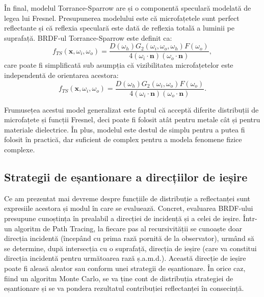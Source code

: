 \documentclass[12pt,a4paper]{report}
\numberwithin{equation}{section} %
\begin{document}
În final, modelul Torrance-Sparrow are și o componentă speculară modelată de legea
lui Fresnel. Presupunerea modelului este că microfațetele sunt perfect reflectante
și că reflexia speculară este dată de reflexia totală a luminii pe suprafață.
BRDF-ul Torrance-Sparrow este definit ca:
\begin{equation}
	f_{TS}(\mathbf{x}, \omega_i, \omega_o) = \frac{D(\omega_h)G_2(\omega_i, \omega_o, \omega_h)F(\omega_o)}{4(\omega_i \cdot \mathbf{n})(\omega_o \cdot \mathbf{n})},
\end{equation}
care poate fi simplificată sub asumpția că vizibilitatea microfațetelor este independentă
de orientarea acestora:
\begin{equation}\label{eq:ts}
	f_{TS}(\mathbf{x}, \omega_i, \omega_o) = \frac{D(\omega_h)G_2(\omega_i, \omega_o)F(\omega_o)}{4(\omega_i \cdot \mathbf{n})(\omega_o \cdot \mathbf{n})}.
\end{equation}

Frumusețea acestui model generalizat este faptul că acceptă diferite distribuții
de microfațete și funcții Fresnel, deci poate fi folosit atât pentru metale cât
și pentru materiale dielectrice. În plus, modelul este destul de simplu pentru a
putea fi folosit în practică, dar suficient de complex pentru a modela fenomene
fizice complexe.

\subsection{Strategii de eșantionare a direcțiilor de ieșire}

Ce am prezentat mai devreme despre funcțiile de distribuție a reflectanței
sunt expresiile acestora și modul în care se evaluează. Concret, evaluarea
BRDF-ului presupune cunoștința în prealabil a direcției de incidență și a celei
de ieșire. Într-un algoritm de Path Tracing, la fiecare pas al recursivității
se cunoaște doar direcția incidentă (începând cu prima rază pornită de la observator),
urmând să se determine, după intersecția cu o suprafață, direcția de ieșire (care
va constitui direcția incidentă pentru următoarea rază ș.a.m.d.). Această
direcție de ieșire poate fi aleasă aleator sau conform unei strategii de eșantionare.
În orice caz, fiind un algoritm Monte Carlo, se va ține cont de distribuția strategiei
de eșantionare și se va pondera rezultatul contribuției reflectanței în consecință.
\end{document}

